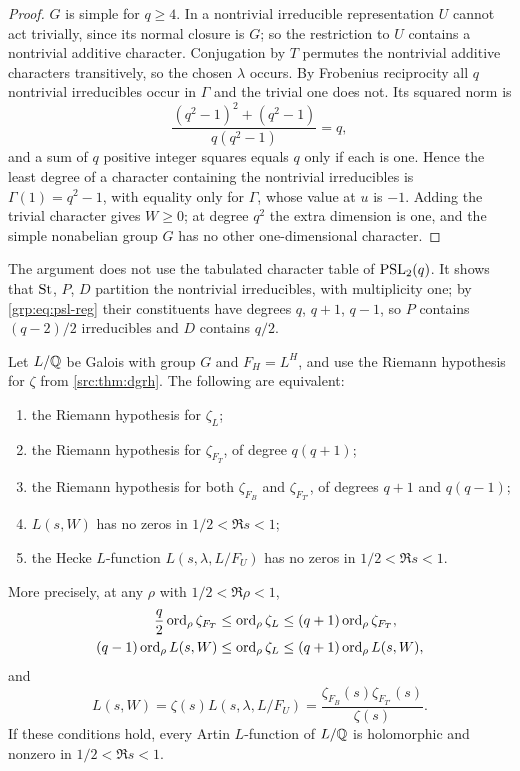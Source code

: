 \begin{proof}
$G$ is simple for $q\ge4$. In a nontrivial irreducible representation $U$
cannot act trivially, since its normal closure is $G$; so the restriction to
$U$ contains a nontrivial additive character. Conjugation by $T$ permutes the
nontrivial additive characters transitively, so the chosen $\lambda$ occurs.
By Frobenius reciprocity all $q$ nontrivial irreducibles occur in $\Gamma$ and
the trivial one does not. Its squared norm is
\[
 \frac{(q^2-1)^2+(q^2-1)}{q(q^2-1)}=q,
\]
and a sum of $q$ positive integer squares equals $q$ only if each is one.
Hence the least degree of a character containing the nontrivial irreducibles
is $\Gamma(1)=q^2-1$, with equality only for $\Gamma$, whose value at $u$ is
$-1$. Adding the trivial character gives $W\ge0$; at degree $q^2$ the extra
dimension is one, and the simple nonabelian group $G$ has no other
one-dimensional character.
\end{proof}

The argument does not use the tabulated character table of $\operatorname{PSL}_2(q)$. It
shows that $\mathrm{St}$, $P$, $D$ partition the nontrivial irreducibles, with
multiplicity one; by \eqref{grp:eq:psl-reg} their constituents have degrees
$q$, $q+1$, $q-1$, so $P$ contains $(q-2)/2$ irreducibles and $D$ contains
$q/2$.

\begin{theorem}\label{grp:thm:psl-transfer}
Let $L/\mathbb{Q}$ be Galois with group $G$ and $F_H=L^H$, and use the Riemann
hypothesis for $\zeta$ from \cref{src:thm:dgrh}. The following are
equivalent:
\begin{enumerate}[label=\textup{(\arabic*)}]
\item the Riemann hypothesis for $\zeta_L$;
\item the Riemann hypothesis for $\zeta_{F_T}$, of degree $q(q+1)$;
\item the Riemann hypothesis for both $\zeta_{F_B}$ and $\zeta_{F_{T'}}$, of
degrees $q+1$ and $q(q-1)$;
\item $L(s,W)$ has no zeros in $1/2<\Re s<1$;
\item the Hecke $L$-function $L(s,\lambda,L/F_U)$ has no zeros in
$1/2<\Re s<1$.
\end{enumerate}
More precisely, at any $\rho$ with $1/2<\Re\rho<1$,
\begin{align}
 \frac q2\operatorname{ord}_\rho\zeta_{F_T}&\le\operatorname{ord}_\rho\zeta_L\le(q+1)\operatorname{ord}_\rho\zeta_{F_T},
 \label{grp:eq:psl-ineq1}\\
 (q-1)\operatorname{ord}_\rho L(s,W)&\le\operatorname{ord}_\rho\zeta_L\le(q+1)\operatorname{ord}_\rho L(s,W),
 \label{grp:eq:psl-ineq2}
\end{align}
and
\[
 L(s,W)=\zeta(s)L(s,\lambda,L/F_U)
 =\frac{\zeta_{F_B}(s)\zeta_{F_{T'}}(s)}{\zeta(s)} .
\]
If these conditions hold, every Artin $L$-function of $L/\mathbb{Q}$ is holomorphic
and nonzero in $1/2<\Re s<1$.
\end{theorem}


